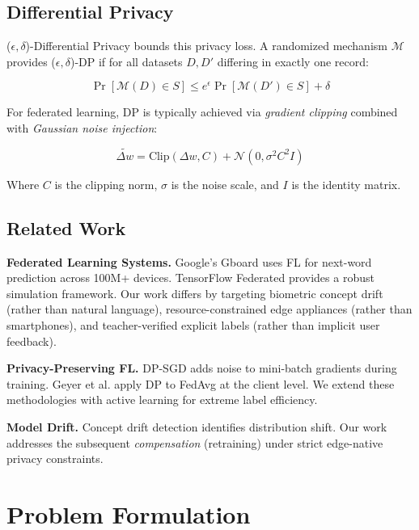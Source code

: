 \documentclass[conference]{IEEEtran}
\begin{document}
\subsection{Differential Privacy}

($\epsilon, \delta$)-Differential Privacy \cite{b11} bounds this privacy loss. A randomized mechanism $\mathcal{M}$ provides ($\epsilon, \delta$)-DP if for all datasets $D, D'$ differing in exactly one record:

\begin{equation}
\Pr[\mathcal{M}(D) \in S] \leq e^{\epsilon} \Pr[\mathcal{M}(D') \in S] + \delta
\end{equation}

For federated learning, DP is typically achieved via \textit{gradient clipping} combined with \textit{Gaussian noise injection}:

\begin{equation}
\tilde{\Delta w} = \text{Clip}(\Delta w, C) + \mathcal{N}(0, \sigma^2 C^2 I)
\label{eq:dp}
\end{equation}

Where $C$ is the clipping norm, $\sigma$ is the noise scale, and $I$ is the identity matrix.

\subsection{Related Work}

\textbf{Federated Learning Systems.} Google's Gboard \cite{b8} uses FL for next-word prediction across 100M+ devices. TensorFlow Federated \cite{b12} provides a robust simulation framework. Our work differs by targeting biometric concept drift (rather than natural language), resource-constrained edge appliances (rather than smartphones), and teacher-verified explicit labels (rather than implicit user feedback).

\textbf{Privacy-Preserving FL.} DP-SGD \cite{b13} adds noise to mini-batch gradients during training. Geyer et al. \cite{b14} apply DP to FedAvg at the client level. We extend these methodologies with active learning for extreme label efficiency.

\textbf{Model Drift.} Concept drift detection \cite{b15} identifies distribution shift. Our work addresses the subsequent \textit{compensation} (retraining) under strict edge-native privacy constraints.

\section{Problem Formulation}
\end{document}
